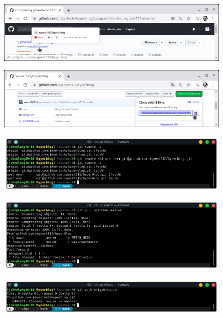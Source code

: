 \documentclass{article}
\begin{document}
\begin{figure}[h!]
  \centering
  \includegraphics[scale=0.75]{./Pictures/246_to_xguest.png}
\end{figure}

\begin{figure}[h!]
  \centering
  \includegraphics[scale=0.75]{./Pictures/247_url_ssh.png}
\end{figure}

\begin{figure}[h!]
  \centering
  \includegraphics[scale=0.75]{./Pictures/248_add_upstream.png}
\end{figure}

\begin{figure}[h!]
  \centering
  \includegraphics[scale=0.75]{./Pictures/249_pull_upstream.png}
\end{figure}

\begin{figure}[h!]
  \centering
  \includegraphics[scale=0.75]{./Pictures/250_push.png}
\end{figure}
\end{document}
